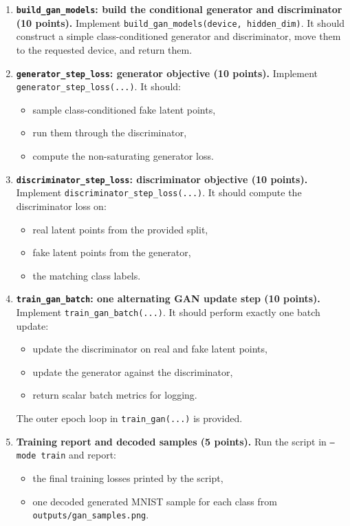 \begin{Q}
\begin{enumerate}

\item \textbf{\texttt{build\_gan\_models}: build the conditional generator and discriminator (10 points).}
Implement \texttt{build\_gan\_models(device, hidden\_dim)}.
It should construct a simple class-conditioned generator and discriminator, move them to the requested device, and return them.

\item \textbf{\texttt{generator\_step\_loss}: generator objective (10 points).}
Implement \texttt{generator\_step\_loss(...)}.
It should:
\begin{itemize}
\item sample class-conditioned fake latent points,
\item run them through the discriminator,
\item compute the non-saturating generator loss.
\end{itemize}

\item \textbf{\texttt{discriminator\_step\_loss}: discriminator objective (10 points).}
Implement \texttt{discriminator\_step\_loss(...)}.
It should compute the discriminator loss on:
\begin{itemize}
\item real latent points from the provided split,
\item fake latent points from the generator,
\item the matching class labels.
\end{itemize}

\item \textbf{\texttt{train\_gan\_batch}: one alternating GAN update step (10 points).}
Implement \texttt{train\_gan\_batch(...)}.
It should perform exactly one batch update:
\begin{itemize}
\item update the discriminator on real and fake latent points,
\item update the generator against the discriminator,
\item return scalar batch metrics for logging.
\end{itemize}
The outer epoch loop in \texttt{train\_gan(...)} is provided.

\item \textbf{Training report and decoded samples (5 points).}
Run the script in \texttt{--mode train} and report:
\begin{itemize}
\item the final training losses printed by the script,
\item one decoded generated MNIST sample for each class from \texttt{outputs/gan\_samples.png}.
\end{itemize}


\end{enumerate}
\end{Q}
